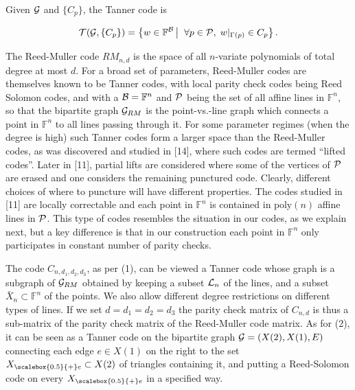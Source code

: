 \documentclass[10pt,a4paper]{article}
\begin{document}
Given ${\cal G}$ and $\{C_{p}\}$, the Tanner code is\par


\[\begin{gathered}
{\cal T}({\cal G},\{C_{p}\})=\left\{w\in\mathbb{F}^{\cal B}\left|\;\vphantom{w\in\mathbb{F}^{\cal B}\forall p\in{\cal P},\;w|_{\Gamma(p)}\in C_{p}}\right.\forall p\in{\cal P},\;w|_{\Gamma(p)}\in C_{p}\right\}.
\end{gathered}\]




The Reed-Muller code $RM_{n,d}$ is the space of all $n$-variate polynomials of total degree at most $d$.
For a broad set of parameters, Reed-Muller codes are themselves known to be Tanner codes, with local parity check codes being Reed Solomon codes, and with a ${\cal B}=\mathbb{F}^{n}$ and ${\cal P}$ being the set of all affine lines in $\mathbb{F}^{n}$, so that the bipartite graph ${\cal G}_{RM}$ is the point-vs.-line graph which connects a point in $\mathbb{F}^{n}$ to all lines passing through it.
For some parameter regimes (when the degree is high) such Tanner codes form a larger space than the Reed-Muller codes, as was discovered and studied in [14], where such codes are termed “lifted codes”.
Later in [11], partial lifts are considered where some of the vertices of ${\cal P}$ are erased and one considers the remaining punctured code. Clearly, different choices of where to puncture will have different properties. The codes studied in [11] are locally correctable and each point in $\mathbb{F}^{n}$ is contained in $\mathrm{poly}(n)$ affine lines in ${\cal P}$.
This type of codes resembles the situation in our codes, as we explain next, but a key difference is that in our construction each point in $\mathbb{F}^{n}$ only participates in constant number of parity checks.\par




The code $C_{n,d_{1},d_{2},d_{3}}$, as per (1), can be viewed a Tanner code whose graph is a subgraph of ${\cal G}_{RM}$ obtained by keeping a subset ${\cal L}_{n}$ of the lines, and a subset $\bar{X}_{n}\subset\mathbb{F}^{n}$ of the points. We also allow different degree restrictions on different types of lines. If we set $d=d_{1}=d_{2}=d_{3}$ the parity check matrix of $C_{n,d}$ is thus a sub-matrix of the parity check matrix of the Reed-Muller code matrix.
As for (2), it can be seen as a Tanner code on the bipartite graph ${\cal G}=(X(2),X(1),E)$ connecting each edge $e\in X(1)$ on the right to the set ${X}_{\scalebox{0.5}{+}e}\subset X(2)$ of triangles containing it, and putting a Reed-Solomon code on every ${X}_{\scalebox{0.5}{+}e}$ in a specified way.\par
\end{document}
